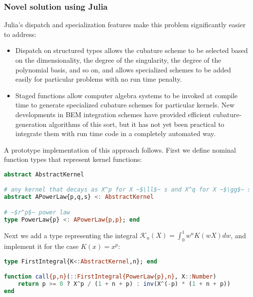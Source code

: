 \subsubsection{Novel solution using Julia}

Julia's dispatch and specialization features make this problem
significantly easier to address:

\begin{itemize}
\item Dispatch on structured types allows the cubature scheme to be selected %
based on the dimensionality, the degree of the singularity, the degree of
the polynomial basis, and so on, and allows specialized schemes to be added
easily for particular problems with no run time penalty.

\item Staged functions allow computer algebra systems to be invoked at
compile time to generate specialized cubature schemes for particular
kernels.
New developments in BEM integration schemes \cite{ReidWhJo14} have
provided efficient cubature-generation algorithms of this sort, but it
has not yet been practical to integrate them with run time code in
a completely automated way.
\end{itemize}

A prototype implementation of this approach follows.
First we define nominal function types that represent kernel functions:

\begin{singlespace}
\begin{lstlisting}[language=julia]
abstract AbstractKernel

# any kernel that decays as X^p for X ~$\ll$~ s and X^q for X ~$\gg$~ s
abstract APowerLaw{p,q,s} <: AbstractKernel

# ~$r^p$~ power law
type PowerLaw{p} <: APowerLaw{p,p}; end
\end{lstlisting}
\end{singlespace}

\noindent
Next we add a type representing the integral
$\mathcal{K}_n(X) = \int_0^1 w^n K(wX) dw$, and implement it for the
case $K(x) = x^p$:

\begin{singlespace}
\begin{lstlisting}[language=julia]
type FirstIntegral{K<:AbstractKernel,n}; end

function call{p,n}(::FirstIntegral{PowerLaw{p},n}, X::Number)
    return p >= 0 ? X^p / (1 + n + p) : inv(X^(-p) * (1 + n + p))
end
\end{lstlisting}
\end{singlespace}


